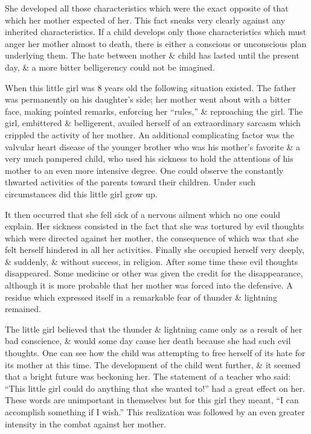 \documentclass{article}
\begin{document}
She developed all those characteristics which were the exact opposite of that which her mother expected of her. This fact sneaks very clearly against any inherited characteristics. If a child develops only those characteristics which must anger her mother almost to death, there is either a conscious or unconscious plan underlying them. The hate between mother \& child has lasted until the present day, \& a more bitter belligerency could not be imagined.

When this little girl was 8 years old the following situation existed. The father was permanently on his daughter's side; her mother went about with a bitter face, making pointed remarks, enforcing her ``rules,'' \& reproaching the girl. The girl, embittered \& belligerent, availed herself of an extraordinary sarcasm which crippled the activity of her mother. An additional complicating factor was the valvular heart disease of the younger brother who was his mother's favorite \& a very much pampered child, who used his sickness to hold the attentions of his mother to an even more intensive degree. One could observe the constantly thwarted activities of the parents toward their children. Under such circumstances did this little girl grow up.

It then occurred that she fell sick of a nervous ailment which no one could explain. Her sickness consisted in the fact that she was tortured by evil thoughts which were directed against her mother, the consequence of which was that she felt herself hindered in all her activities. Finally she occupied herself very deeply, \& suddenly, \& without success, in religion. After some time these evil thoughts disappeared. Some medicine or other was given the credit for the disappearance, although it is more probable that her mother was forced into the defensive. A residue which expressed itself in a remarkable fear of thunder \& lightning remained.

The little girl believed that the thunder \& lightning came only as a result of her bad conscience, \& would some day cause her death because she had such evil thoughts. One can see how the child was attempting to free herself of its hate for its mother at this time. The development of the child went further, \& it seemed that a bright future was beckoning her. The statement of a teacher who said: ``This little girl could do anything that she wanted to!'' had a great effect on her. These words are unimportant in themselves but for this girl they meant, ``I can accomplish something if I wish.'' This realization was followed by an even greater intensity in the combat against her mother.
\end{document}
